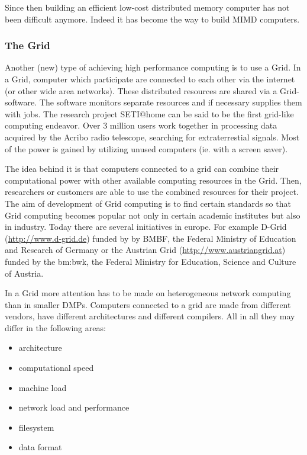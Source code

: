 Since then building an efficient low-cost distributed memory computer
has not been difficult anymore. Indeed it has become the way to build
MIMD computers.

\subsubsection{The Grid}

Another (new) type of achieving high performance computing is to use a
Grid. In a Grid, computer which participate are connected to each other
via the internet (or other wide area networks). These distributed
resources are shared via a 
Grid-software. The software monitors separate resources and if
necessary supplies them with jobs. The research project SETI@home can
be said to be the first grid-like computing endeavor. Over 3 million
users work together in processing data acquired by the Acribo radio
telescope, searching for extraterrestial signals. Most of the power is
gained by utilizing unused computers (ie. with a screen saver).

The idea behind it is that computers connected to a grid can combine
their computational power with other available computing resources in the
Grid. Then, researchers or customers are able to use the combined
resources for their project. The aim of development of Grid computing
is to find certain standards so that Grid computing becomes popular
not only in certain academic institutes but also in industry. Today
there are several initiatives in europe. For example D-Grid
(\url{http://www.d-grid.de}) funded
by by BMBF, the Federal Ministry of Education and Research of Germany
or the Austrian Grid (\url{http://www.austriangrid.at}) funded by the
bm:bwk, the Federal Ministry for Education, Science and Culture of
Austria.

In a Grid more attention has to be made on heterogeneous network
computing than in smaller DMPs. Computers connected to a grid are made
from different vendors, have different architectures and different
compilers. All in all they may differ in the following areas:

\begin{itemize}
\item architecture
\item computational speed
\item machine load
\item network load and performance
\item filesystem
\item data format
\end{itemize}

